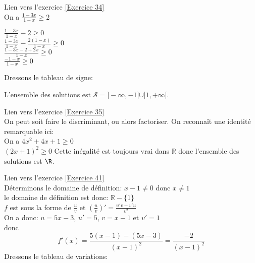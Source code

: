 \documentclass[12pt,fleqn]{report} %
\begin{document}
\begin{correction}Lien vers l'exercice   \ref{Exercice 34}\\
	On a $\frac{1-3x}{1-x}\geqslant 2$\\ [2mm]
	\begin{center}
		$\frac{1-3x}{1-x}-2\geqslant0$ \\ [2mm]
		$\frac{1-3x}{1-x}- \frac{2(1-x)}{1-x}\geqslant0$ \\ [2mm]
		$\frac{1-3x-2+2x}{1-x}\geqslant0$\\ [2mm]
		$\frac{-1-x}{1-x}\geqslant0$\\ [2mm]
	\end{center}
	Dressons le tableau de signe: 
	\begin{center}
	\end{center}
	L'ensemble des solutions est $\mathcal{S} = ]-\infty,-1] \cup ]1,+\infty[$.
\end{correction}


\begin{correction}Lien vers l'exercice   \ref{Exercice 35}\\
	On peut soit faire le discriminant, ou alors factoriser. On reconnaît une identité remarquable ici:\\[2mm]
	On a $4x^2+4x+1\geqslant0$\\[2mm]
	$(2x+1)^2\geqslant0$
	Cette inégalité est toujours vrai dans $\mathbb{R}$
	donc l'ensemble des solutions est $\R$.
\end{correction}

\begin{correction}Lien vers l'exercice   \ref{Exercice 41}\\
	Déterminons le domaine de définition: $x-1\neq0$ donc $x\neq1$\\[2mm]
	le domaine de définition est donc: $\mathbb{R}-\lbrace 1 \rbrace$\\[2mm]
	$f$ est sous la forme de $\frac{u}{v}$ et $\left(\frac{u}{v}\right)' = \frac{u'v-v'u}{v^2}$\\[2mm]
	On a donc: $u=5x-3$, $u'=5$, $v=x-1$ et $v'=1$\\[2mm]
	donc
	\[
	f'(x)= \frac{5(x-1)-(5x-3)}{(x-1)^2}=\frac{-2}{(x-1)^2}
	\]
	Dressons le tableau de variations: \\[2mm]
	\begin{center}
	\end{center}
\end{correction}
\end{document}
